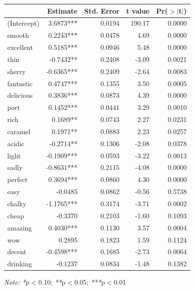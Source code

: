 \documentclass[11pt,preprint]{elsarticle}
\let\origtable\table
\let\endorigtable\endtable
\renewenvironment{table}[1][2] {
    \expandafter\origtable\expandafter[H]
} {
    \endorigtable
}
\numberwithin{equation}{section}
\numberwithin{figure}{section}
\numberwithin{table}{section}
\begin{document}
\begin{table}[ht]
\centering
\caption{OLS Regression Results (Top 20 Features)}
\label{tab:ols_results}
\begin{tabular}{lrrrr}
\toprule
\textbf{} & \textbf{Estimate} & \textbf{Std. Error} & \textbf{t value} & \textbf{Pr($>$$|$t$|$)} \\
\midrule
(Intercept) & 3.6873*** & 0.0194 & 190.17 & 0.0000 \\
smooth      & 0.2243*** & 0.0478 & 4.69   & 0.0000 \\
excellent   & 0.5185*** & 0.0946 & 5.48   & 0.0000 \\
thin        & -0.7432** & 0.2408 & -3.09 & 0.0021 \\
sherry      & -0.6365*** & 0.2409 & -2.64 & 0.0083 \\
fantastic   & 0.4747*** & 0.1355 & 3.50   & 0.0005 \\
delicious   & 0.3836*** & 0.0873 & 4.39   & 0.0000 \\
port        & 0.1452*** & 0.0441 & 3.29   & 0.0010 \\
rich        & 0.1689** & 0.0743 & 2.27   & 0.0231 \\
caramel     & 0.1971** & 0.0883 & 2.23   & 0.0257 \\
acidic      & -0.2714** & 0.1306 & -2.08 & 0.0378 \\
light       & -0.1909*** & 0.0593 & -3.22 & 0.0013 \\
sadly       & -0.8631*** & 0.2115 & -4.08 & 0.0000 \\
perfect     & 0.3694*** & 0.0860 & 4.30   & 0.0000 \\
easy        & -0.0485 & 0.0862 & -0.56 & 0.5738 \\
chalky      & -1.1765*** & 0.3174 & -3.71 & 0.0002 \\
cheap       & -0.3370 & 0.2103 & -1.60 & 0.1093 \\
amazing     & 0.4030*** & 0.1130 & 3.57   & 0.0004 \\
wow         & 0.2895 & 0.1823 & 1.59   & 0.1124 \\
decent      & -0.4598*** & 0.1685 & -2.73 & 0.0064 \\
drinking    & -0.1237 & 0.0834 & -1.48 & 0.1382 \\
\bottomrule
\end{tabular}
\begin{flushleft}
\footnotesize\textit{Note:} \textit{*}p$<$0.10; \textit{**}p$<$0.05; \textit{***}p$<$0.01
\end{flushleft}
\end{table}
\end{document}
